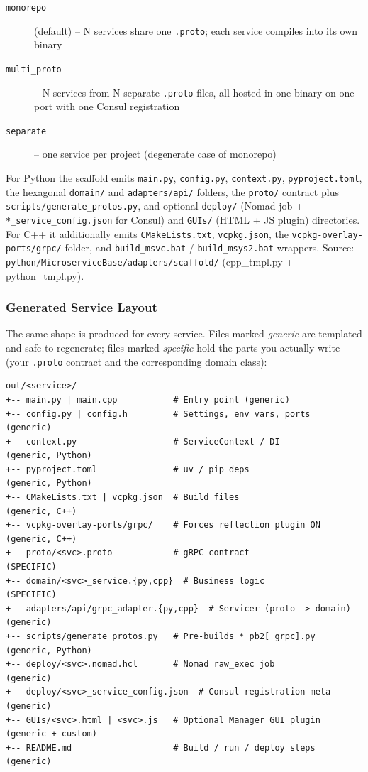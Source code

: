 \begin{description}
   \item[\texttt{monorepo}] (default) -- N services share one \texttt{.proto}; each
        service compiles into its own binary
   \item[\texttt{multi\_proto}] -- N services from N separate \texttt{.proto} files,
        all hosted in one binary on one port with one Consul registration
   \item[\texttt{separate}] -- one service per project (degenerate case of monorepo)
\end{description}

\noindent
For Python the scaffold emits \texttt{main.py}, \texttt{config.py}, \texttt{context.py},
\texttt{pyproject.toml}, the hexagonal \texttt{domain/} and \texttt{adapters/api/}
folders, the \texttt{proto/} contract plus \texttt{scripts/generate\_protos.py}, and
optional \texttt{deploy/} (Nomad job + \texttt{*\_service\_config.json} for Consul) and
\texttt{GUIs/} (HTML + JS plugin) directories.  For C++ it additionally emits
\texttt{CMakeLists.txt}, \texttt{vcpkg.json}, the \texttt{vcpkg-overlay-ports/grpc/}
folder, and \texttt{build\_msvc.bat} / \texttt{build\_msys2.bat} wrappers.  Source:
\texttt{python/MicroserviceBase/adapters/scaffold/} (cpp\_tmpl.py + python\_tmpl.py).

\subsubsection{Generated Service Layout}

The same shape is produced for every service.  Files marked \emph{generic} are
templated and safe to regenerate; files marked \emph{specific} hold the parts you
actually write (your \texttt{.proto} contract and the corresponding domain class):

\begin{verbatim}
out/<service>/
+-- main.py | main.cpp           # Entry point (generic)
+-- config.py | config.h         # Settings, env vars, ports        (generic)
+-- context.py                   # ServiceContext / DI              (generic, Python)
+-- pyproject.toml               # uv / pip deps                    (generic, Python)
+-- CMakeLists.txt | vcpkg.json  # Build files                      (generic, C++)
+-- vcpkg-overlay-ports/grpc/    # Forces reflection plugin ON      (generic, C++)
+-- proto/<svc>.proto            # gRPC contract                    (SPECIFIC)
+-- domain/<svc>_service.{py,cpp}  # Business logic                 (SPECIFIC)
+-- adapters/api/grpc_adapter.{py,cpp}  # Servicer (proto -> domain) (generic)
+-- scripts/generate_protos.py   # Pre-builds *_pb2[_grpc].py       (generic, Python)
+-- deploy/<svc>.nomad.hcl       # Nomad raw_exec job               (generic)
+-- deploy/<svc>_service_config.json  # Consul registration meta    (generic)
+-- GUIs/<svc>.html | <svc>.js   # Optional Manager GUI plugin      (generic + custom)
+-- README.md                    # Build / run / deploy steps       (generic)
\end{verbatim}

